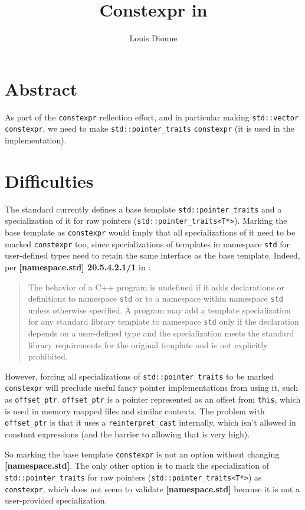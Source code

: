 \documentclass{wg21}
\title{Constexpr in \cc{std::pointer_traits}}
\author{Louis Dionne}{ldionne.2@gmail.com}
\newcommand{\cc}[1]{\texttt{#1}}
\begin{document}
\maketitle

\section{Abstract}
As part of the \cc{constexpr} reflection effort, and in particular making
\cc{std::vector} \cc{constexpr}, we need to make \cc{std::pointer_traits}
\cc{constexpr} (it is used in the implementation).


\section{Difficulties}
The standard currently defines a base template \cc{std::pointer_traits} and a
specialization of it for raw pointers (\cc{std::pointer_traits<T*>}). Marking
the base template as \cc{constexpr} would imply that all specializations of it
need to be marked \cc{constexpr} too, since specializations of templates in
namespace \cc{std} for user-defined types need to retain the same interface
as the base template. Indeed, per \textbf{[namespace.std] 20.5.4.2.1/1} in
\cite{N4727}:

\begin{quote}
  The behavior of a C++ program is undefined if it adds declarations or
  definitions to namespace \texttt{std} or to a namespace within namespace
  \texttt{std} unless otherwise specified. A program may add a template
  specialization for any standard library template to namespace \texttt{std}
  only if the declaration depends on a user-defined type and the specialization
  meets the standard library requirements for the original template and is not
  explicitly prohibited.
\end{quote}

However, forcing all specializations of \cc{std::pointer_traits} to be marked
\cc{constexpr} will preclude useful fancy pointer implementations from using
it, such as \cc{offset_ptr}. \cc{offset_ptr} is a pointer represented as an
offset from \cc{this}, which is used in memory mapped files and similar
contexts. The problem with \cc{offset_ptr} is that it uses a \cc{reinterpret_cast}
internally, which isn't allowed in constant expressions (and the barrier to
allowing that is very high).

So marking the base template \cc{constexpr} is not an option without changing
\textbf{[namespace.std]}. The only other option is to mark the specialization
of \cc{std::pointer_traits} for raw pointers (\cc{std::pointer_traits<T*>}) as
\cc{constexpr}, which does not seem to validate \textbf{[namespace.std]} because
it is not a user-provided specialization.
\end{document}
